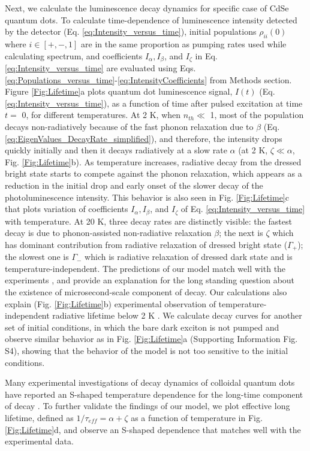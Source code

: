 \documentclass[aps,pra,preprint,groupedaddress]{revtex4-1}
\begin{document}
Next, we calculate the luminescence decay dynamics for specific case of CdSe quantum dots. To calculate time-dependence of luminescence intensity detected by the detector (Eq. \ref{eq:Intensity_versus_time}), initial populations $\rho_{ii}(0)$ where $i\in[+,-,1]$ are in the same proportion as pumping rates used while calculating spectrum, and coefficients $I_{\alpha}, I_{\beta}$, and $I_{\zeta}$ in Eq. \ref{eq:Intensity_versus_time} are evaluated using Eqs. \ref{eq:Populations_versus_time}-\ref{eq:IntensityCoefficients} from Methods section. Figure \ref{Fig:Lifetime}a plots quantum dot luminescence signal, $I(t)$ (Eq. \ref{eq:Intensity_versus_time}), as a function of time after pulsed excitation at time $t =$ 0, for different temperatures. At 2 K, when $n_{th} \ll$ 1, most of the population decays non-radiatively because of the fast phonon relaxation due to $\beta$ (Eq. \ref{eq:EigenValues_DecayRate_simplified}), and therefore, the intensity drops quickly initially and then it decays radiatively at a slow rate $\alpha$ (at 2 K, $\zeta \ll \alpha$, Fig. \ref{Fig:Lifetime}b). As temperature increases, radiative decay from the dressed bright state starts to compete against the phonon relaxation, which appears as a reduction in the initial drop and early onset of the slower decay of the photoluminescence intensity. This behavior is also seen in Fig. \ref{Fig:Lifetime}c that plots variation of coefficients $I_{\alpha}, I_{\beta}$, and $I_{\zeta}$ of Eq. \ref{eq:Intensity_versus_time} with temperature.  At 20 K, three decay rates are distinctly visible: the fastest decay is due to phonon-assisted non-radiative relaxation $\beta$; the next is $\zeta$ which has dominant contribution from radiative relaxation of dressed bright state ($\Gamma_+$); the slowest one is $\Gamma_-$ which is radiative relaxation of dressed dark state and is temperature-independent. The predictions of our model match well with the experiments \cite{DeMelloDonega2006}, and provide an explanation for the long standing question about the existence of microsecond-scale component of decay. Our calculations also explain (Fig. \ref{Fig:Lifetime}b) experimental observation of temperature-independent radiative lifetime below 2 K \cite{Crooker2003}. We calculate decay curves for another set of initial conditions, in which the bare dark exciton is not pumped and observe similar behavior as in Fig. \ref{Fig:Lifetime}a (Supporting Information Fig. S4), showing that the behavior of the model is not too sensitive to the initial conditions.

Many experimental investigations of decay dynamics of colloidal quantum dots have reported an S-shaped temperature dependence for the long-time component of decay \cite{DeMelloDonega2006, Biadala2009, Oron2009}. To further validate the findings of our model, we plot effective long lifetime, defined as $1/\tau_{eff} = \alpha + \zeta$ as a function of temperature in Fig. \ref{Fig:Lifetime}d, and observe an S-shaped dependence that matches well with the experimental data.  
\end{document}
